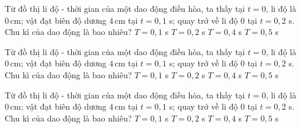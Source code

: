 \begin{ex}
Từ đồ thị li độ - thời gian của một dao động điều hòa, ta thấy tại $t = 0$, li độ là $0\,\text{cm}$; vật đạt biên độ dương $4\,\text{cm}$ tại $t = 0,1$ s; quay trở về li độ 0 tại $t = 0,2$ s. Chu kì của dao động là bao nhiêu?
\choice
{$T = 0{,}1$ s}
{$T = 0{,}2$ s}
{\True $T = 0{,}4$ s}
{$T = 0{,}5$ s}
\end{ex}

\begin{ex}
Từ đồ thị li độ - thời gian của một dao động điều hòa, ta thấy tại $t = 0$, li độ là $0\,\text{cm}$; vật đạt biên độ dương $4\,\text{cm}$ tại $t = 0,1$ s; quay trở về li độ 0 tại $t = 0,2$ s. Chu kì của dao động là bao nhiêu?
\choice
{$T = 0{,}1$ s}
{$T = 0{,}2$ s}
{\True $T = 0{,}4$ s}
{$T = 0{,}5$ s}
\end{ex}

\begin{ex}
Từ đồ thị li độ - thời gian của một dao động điều hòa, ta thấy tại $t = 0$, li độ là $0\,\text{cm}$; vật đạt biên độ dương $4\,\text{cm}$ tại $t = 0,1$ s; quay trở về li độ 0 tại $t = 0,2$ s. Chu kì của dao động là bao nhiêu?
\choice
{$T = 0{,}1$ s}
{$T = 0{,}2$ s}
{\True $T = 0{,}4$ s}
{$T = 0{,}5$ s}
\end{ex}

